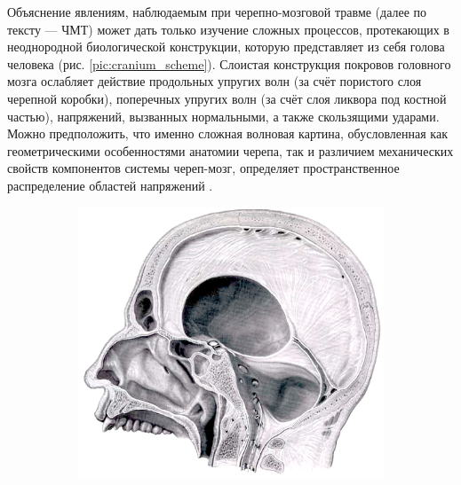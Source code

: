 Объяснение явлениям, наблюдаемым при черепно-мозговой травме (далее по тексту — ЧМТ) может дать только изучение сложных процессов, протекающих в неоднородной биологической конструкции, которую представляет из себя голова человека (рис. \ref{pic:cranium_scheme}). Слоистая конструкция покровов головного мозга ослабляет действие продольных упругих волн (за счёт пористого слоя черепной коробки), поперечных упругих волн (за счёт слоя ликвора под костной частью), напряжений, вызванных нормальными, а также скользящими ударами. Можно предположить, что именно сложная волновая картина, обусловленная как геометрическими особенностями анатомии черепа, так и различием механических свойств компонентов системы череп-мозг, определяет пространственное распределение областей напряжений \cite{belocerkovsky_agapov_petrov}.

\begin{figure}[htp]
\centering
\begin{subfigure}[b]{0.6\textwidth}
\centering
\includegraphics[width=\textwidth]{png/cranium/real-scheme-01.png}
\end{subfigure}
\begin{subfigure}[b]{0.6\textwidth}
\centering

\end{subfigure}
\end{figure}

